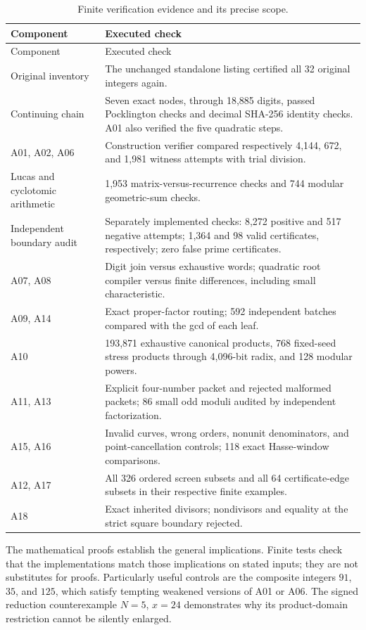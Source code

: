 \documentclass[11pt,a4paper]{article}
\theoremstyle{definition}\newtheorem{definition}[theorem]{Definition}
\theoremstyle{remark}\newtheorem{remark}[theorem]{Remark}
\begin{document}
{\small
\begin{longtable}{@{}>{\raggedright\arraybackslash}p{}p{}@{}}
\caption{Finite verification evidence and its precise scope.}
\label{tab:revision-audit}\\
\toprule
Component & Executed check\\
\midrule\endfirsthead
\toprule Component & Executed check\\\midrule\endhead
\bottomrule\endfoot
Original inventory & The unchanged standalone listing certified all
32 original integers again.\\
Continuing chain & Seven exact nodes, through 18,885 digits, passed
Pocklington checks and decimal SHA-256 identity checks. A01 also
verified the five quadratic steps.\\
A01, A02, A06 & Construction verifier compared respectively
4,144, 672, and 1,981 witness attempts with trial division.\\
Lucas and cyclotomic arithmetic & 1,953 matrix-versus-recurrence
checks and 744 modular geometric-sum checks.\\
Independent boundary audit & Separately implemented checks:
8,272 positive and 517 negative attempts; 1,364 and 98 valid
certificates, respectively; zero false prime certificates.\\
A07, A08 & Digit join versus exhaustive words; quadratic root compiler
versus finite differences, including small characteristic.\\
A09, A14 & Exact proper-factor routing; 592 independent batches
compared with the gcd of each leaf.\\
A10 & 193,871 exhaustive canonical products, 768 fixed-seed stress
products through 4,096-bit radix, and 128 modular powers.\\
A11, A13 & Explicit four-number packet and rejected malformed packets;
86 small odd moduli audited by independent factorization.\\
A15, A16 & Invalid curves, wrong orders, nonunit denominators, and
point-cancellation controls; 118 exact Hasse-window comparisons.\\
A12, A17 & All 326 ordered screen subsets and all 64 certificate-edge
subsets in their respective finite examples.\\
A18 & Exact inherited divisors; nondivisors and equality at the
strict square boundary rejected.\\
\end{longtable}}

The mathematical proofs establish the general implications. Finite tests
check that the implementations match those implications on stated inputs;
they are not substitutes for proofs. Particularly useful controls are the
composite integers $91$, $35$, and $125$, which satisfy tempting
weakened versions of A01 or A06. The signed reduction counterexample
$N=5$, $x=24$ demonstrates why its product-domain restriction cannot be
silently enlarged.
\end{document}
